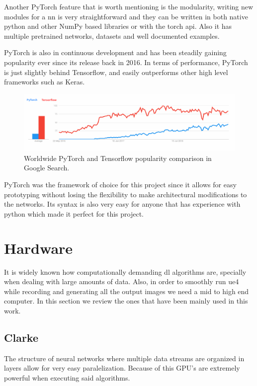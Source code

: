 Another PyTorch feature that is worth mentioning is the modularity, writing new modules for a \gls{nn} is very straightforward and they can be written in both native python and other NumPy based libraries or with the torch \gls{api}. Also it has multiple pretrained networks, datasets and well documented examples.

PyTorch is also in continuous development and has been steadily gaining popularity ever since its release back in 2016. In terms of performance, PyTorch is just slightly behind Tensorflow, and easily outperforms other high level frameworks such as Keras.

\begin{figure}[h]
	\includegraphics[width=\textwidth]{archivos/pytorch.png}
	\centering
	\caption{Worldwide PyTorch and Tensorflow popularity comparison in Google Search.}
	\label{fig:pytorch}
\end{figure}

PyTorch was the framework of choice for this project since it allows for easy prototyping without losing the flexibility to make architectural modifications to the networks. Its syntax is also very easy for anyone that has experience with python which made it perfect for this project.

\section{Hardware}
\label{sec:hardware}
It is widely known how computationally demanding \gls{dl} algorithms are, specially when dealing with large amounts of data. Also, in order to smoothly run \gls{ue4} while recording and generating all the output images we need a mid to high end computer. In this section we review the ones that have been mainly used in this work.

\subsection{Clarke}

The structure of neural networks where multiple data streams are organized in layers allow for very easy paralelization. Because of this GPU's are extremely powerful when executing said algorithms.

